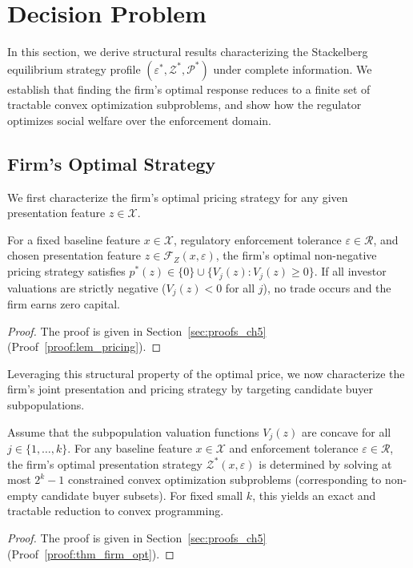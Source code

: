 \section{Decision Problem}
\label{sec:decision}

In this section, we derive structural results characterizing the Stackelberg equilibrium strategy profile $(\varepsilon^*, \mathcal{Z}^*, \mathcal{P}^*)$ under complete information. We establish that finding the firm's optimal response reduces to a finite set of tractable convex optimization subproblems, and show how the regulator optimizes social welfare over the enforcement domain.

\subsection{Firm's Optimal Strategy}

We first characterize the firm's optimal pricing strategy for any given presentation feature $z \in \mathcal{X}$.

\begin{lemma}
\label{lem:pricing}
For a fixed baseline feature $x \in \mathcal{X}$, regulatory enforcement tolerance $\varepsilon \in \mathcal{R}$, and chosen presentation feature $z \in \mathcal{F}_Z(x, \varepsilon)$, the firm's optimal non-negative pricing strategy satisfies $p^*(z) \in \{0\} \cup \{V_j(z) : V_j(z) \ge 0\}$. If all investor valuations are strictly negative ($V_j(z) < 0$ for all $j$), no trade occurs and the firm earns zero capital.
\end{lemma}
\begin{proof}
The proof is given in Section~\ref{sec:proofs_ch5} (Proof~\ref{proof:lem_pricing}).
\end{proof}

Leveraging this structural property of the optimal price, we now characterize the firm's joint presentation and pricing strategy by targeting candidate buyer subpopulations.

\begin{theorem}
\label{thm:firm_opt}
Assume that the subpopulation valuation functions $V_j(z)$ are concave for all $j \in \{1, \dots, k\}$. For any baseline feature $x \in \mathcal{X}$ and enforcement tolerance $\varepsilon \in \mathcal{R}$, the firm's optimal presentation strategy $\mathcal{Z}^*(x, \varepsilon)$ is determined by solving at most $2^k - 1$ constrained convex optimization subproblems (corresponding to non-empty candidate buyer subsets). For fixed small $k$, this yields an exact and tractable reduction to convex programming.
\end{theorem}
\begin{proof} The proof is given in Section~\ref{sec:proofs_ch5} (Proof~\ref{proof:thm_firm_opt}).
\end{proof}

